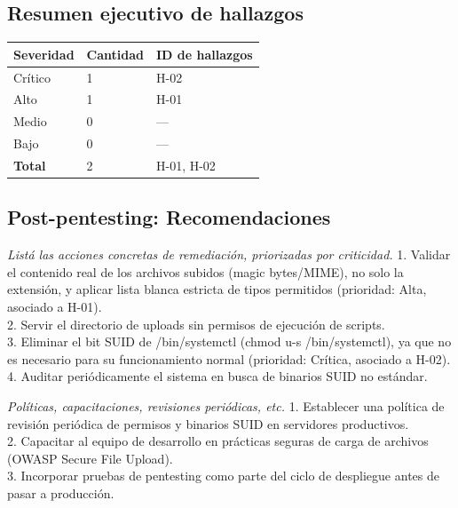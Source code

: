 \documentclass[11pt,a4paper]{article}
\begin{document}
\subsection{Resumen ejecutivo de hallazgos}

\begin{center}
\renewcommand{\arraystretch}{1.4}
\begin{tabularx}{\textwidth}{@{} p{4cm} p{3cm} X @{}}
\toprule
\textbf{Severidad} & \textbf{Cantidad} & \textbf{ID de hallazgos} \\
\midrule
\cellcolor{rojosuave} Crítico & 1 & H-02 \\
\cellcolor{naranjasuave} Alto & 1 & H-01 \\
\cellcolor{verdesuave} Medio & 0 & --- \\
\cellcolor{azulsuave} Bajo & 0 & --- \\
\midrule
\textbf{Total} & 2 & H-01, H-02 \\
\bottomrule
\end{tabularx}
\end{center}

\subsection{Post-pentesting: Recomendaciones}

\begin{campo}
\textit{Listá las acciones concretas de remediación, priorizadas por criticidad.}
1. Validar el contenido real de los archivos subidos (magic bytes/MIME), no solo la extensión, y aplicar lista blanca estricta de tipos permitidos (prioridad: Alta, asociado a H-01).\\ 2. Servir el directorio de uploads sin permisos de ejecución de scripts.\\ 3. Eliminar el bit SUID de /bin/systemctl (chmod u-s /bin/systemctl), ya que no es necesario para su funcionamiento normal (prioridad: Crítica, asociado a H-02).\\ 4. Auditar periódicamente el sistema en busca de binarios SUID no estándar.\\\vspace{0.5cm}
\end{campo}

\begin{campo}
\textit{Políticas, capacitaciones, revisiones periódicas, etc.}
1. Establecer una política de revisión periódica de permisos y binarios SUID en servidores productivos.\\ 2. Capacitar al equipo de desarrollo en prácticas seguras de carga de archivos (OWASP Secure File Upload).\\ 3. Incorporar pruebas de pentesting como parte del ciclo de despliegue antes de pasar a producción.\\\vspace{0.5cm}
\end{campo}
\end{document}
